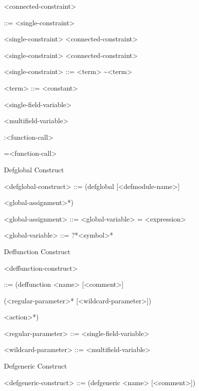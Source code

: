 \documentclass[letterpaper,10pt,english]{sphinxmanual}
\begin{document}
\textless{}connected-constraint\textgreater{}

::= \textless{}single-constraint\textgreater{} \textbar{}

\textless{}single-constraint\textgreater{} \sphinxstylestrong{\&} \textless{}connected-constraint\textgreater{} \textbar{}

\textless{}single-constraint\textgreater{} \sphinxstylestrong{\textbar{}} \textless{}connected-constraint\textgreater{}

\textless{}single-constraint\textgreater{} ::= \textless{}term\textgreater{} \textbar{} \textasciitilde{}\textless{}term\textgreater{}

\textless{}term\textgreater{} ::= \textless{}constant\textgreater{} \textbar{}

\textless{}single-field-variable\textgreater{} \textbar{}

\textless{}multifield-variable\textgreater{} \textbar{}

:\textless{}function-call\textgreater{} \textbar{}

=\textless{}function-call\textgreater{}

Defglobal Construct

\textless{}defglobal-construct\textgreater{} ::= (defglobal {[}\textless{}defmodule-name\textgreater{}{]}

\textless{}global-assignment\textgreater{}*)

\textless{}global-assignment\textgreater{} ::= \textless{}global-variable\textgreater{} = \textless{}expression\textgreater{}

\textless{}global-variable\textgreater{} ::= ?*\textless{}symbol\textgreater{}*

Deffunction Construct

\textless{}deffunction-construct\textgreater{}

::= (deffunction \textless{}name\textgreater{} {[}\textless{}comment\textgreater{}{]}

(\textless{}regular-parameter\textgreater{}* {[}\textless{}wildcard-parameter\textgreater{}{]})

\textless{}action\textgreater{}*)

\textless{}regular-parameter\textgreater{} ::= \textless{}single-field-variable\textgreater{}

\textless{}wildcard-parameter\textgreater{} ::= \textless{}multifield-variable\textgreater{}

Defgeneric Construct

\textless{}defgeneric-construct\textgreater{} ::= (defgeneric \textless{}name\textgreater{} {[}\textless{}comment\textgreater{}{]})
\end{document}
